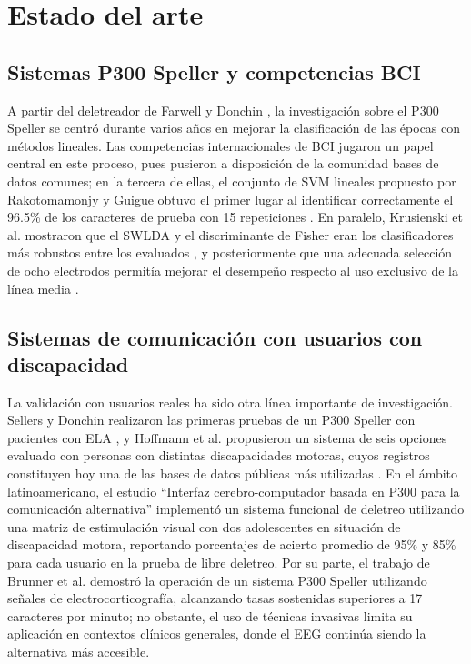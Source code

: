 \section[ESTADO DEL ARTE]{Estado del arte}

\subsection{Sistemas P300 Speller y competencias BCI}

A partir del deletreador de Farwell y Donchin \cite{farwell1988}, la investigación sobre el P300
Speller se centró durante varios años en mejorar la clasificación de las épocas con métodos
lineales. Las competencias internacionales de BCI jugaron un papel central en este proceso, pues
pusieron a disposición de la comunidad bases de datos comunes; en la tercera de ellas, el conjunto
de SVM lineales propuesto por Rakotomamonjy y Guigue obtuvo el primer lugar al identificar
correctamente el 96.5\% de los caracteres de prueba con 15 repeticiones \cite{rakotomamonjy2008}.
En paralelo, Krusienski et al. mostraron que el SWLDA y el discriminante de Fisher eran los
clasificadores más robustos entre los evaluados \cite{krusienski2006}, y posteriormente que una
adecuada selección de ocho electrodos permitía mejorar el desempeño respecto al uso exclusivo de la
línea media \cite{krusienski2008}.

\subsection{Sistemas de comunicación con usuarios con discapacidad}

La validación con usuarios reales ha sido otra línea importante de investigación. Sellers y
Donchin realizaron las primeras pruebas de un P300 Speller con pacientes con ELA
\cite{sellers2006}, y Hoffmann et al. propusieron un sistema de seis opciones evaluado con personas
con distintas discapacidades motoras, cuyos registros constituyen hoy una de las bases de datos
públicas más utilizadas \cite{hoffmann2008}. En el ámbito latinoamericano, el estudio ``Interfaz
cerebro-computador basada en P300 para la comunicación alternativa'' \cite{garciacossio2011}
implementó un sistema funcional de deletreo utilizando una matriz de estimulación visual con dos
adolescentes en situación de discapacidad motora, reportando porcentajes de acierto promedio de 95\%
y 85\% para cada usuario en la prueba de libre deletreo. Por su parte, el trabajo de Brunner et
al. \cite{brunner2011} demostró la operación de un sistema P300 Speller utilizando señales de
electrocorticografía, alcanzando tasas sostenidas superiores a 17 caracteres por minuto; no
obstante, el uso de técnicas invasivas limita su aplicación en contextos clínicos generales, donde
el EEG continúa siendo la alternativa más accesible.

